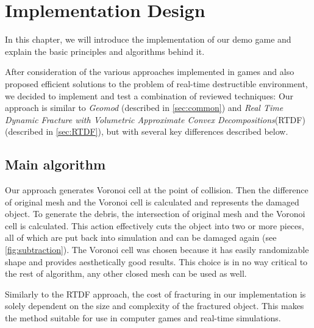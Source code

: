 \chapter{Implementation Design}
\label{chaptImplementation}
In this chapter, we will introduce the implementation of our demo game and explain the basic principles and algorithms behind it.

After consideration of the various approaches implemented in games and also proposed efficient solutions to the problem of real-time destructible environment, we decided to implement and test a combination of reviewed techniques:  Our approach is similar to \emph{Geomod} (described in \cref{sec:common}) and \emph{Real Time Dynamic Fracture with Volumetric Approximate Convex Decompositions}(RTDF) (described in \cref{sec:RTDF}), but with several key differences described below.

\section{Main algorithm}
Our approach generates Voronoi cell at the point of collision. Then the difference of original mesh and the Voronoi cell is calculated and represents the damaged object. To generate the debris, the intersection of original mesh and the Voronoi cell is calculated. This action effectively cuts the object into two or more pieces, all of which are put back into simulation and can be damaged again (see \cref{fig:subtraction}). The Voronoi cell was chosen because it has easily randomizable shape and provides aesthetically good results. This choice is in no way critical to the rest of algorithm, any other closed mesh can be used as well.

Similarly to the RTDF approach, the cost of fracturing in our implementation is solely dependent on the size and complexity of the fractured object.  This makes the method suitable for use in computer games and real-time simulations. 

